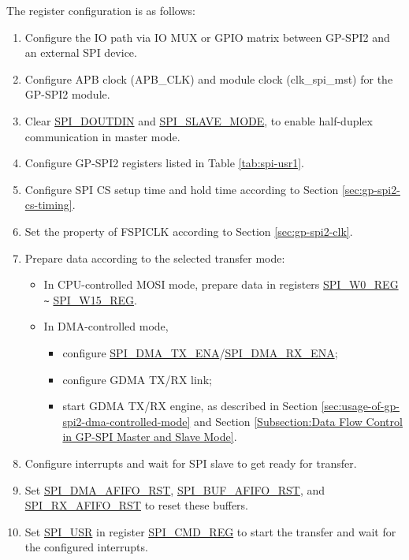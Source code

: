 \documentclass[main\_\_EN.tex]{subfiles}
\begin{document}
The register configuration is as follows:
\begin{enumerate}
    \item Configure the IO path via IO MUX or GPIO matrix between GP-SPI2 and an external SPI device.
    \item Configure APB clock (APB\_CLK) and module clock (clk\_spi\_mst) for the GP-SPI2 module.

    \item Clear \hyperref[fielddesc:SPIDOUTDIN]{SPI\_DOUTDIN} and \hyperref[fielddesc:SPISLAVEMODE]{SPI\_SLAVE\_MODE}, to enable half-duplex communication in master mode.

    \item Configure GP-SPI2 registers listed in Table \ref{tab:spi-usr1}.

    \item Configure SPI CS setup time and hold time according to Section \ref{sec:gp-spi2-cs-timing}.

    \item Set the property of FSPICLK according to Section \ref{sec:gp-spi2-clk}.

    \item Prepare data according to the selected transfer mode:
    \begin{itemize}
        \item In CPU-controlled MOSI mode, prepare data in registers \hyperref[regdesc:SPIW0REG]{SPI\_W0\_REG} \verb+~+ \hyperref[regdesc:SPIW15REG]{SPI\_W15\_REG}.

        \item In DMA-controlled mode,
        \begin{itemize}
            \item configure \hyperref[fielddesc:SPIDMATXENA]{SPI\_DMA\_TX\_ENA}/\hyperref[fielddesc:SPIDMARXENA]{SPI\_DMA\_RX\_ENA};
            \item configure GDMA TX/RX link;
            \item start GDMA TX/RX engine, as described in Section \ref{sec:usage-of-gp-spi2-dma-controlled-mode} and Section \ref{Subsection:Data Flow Control in GP-SPI Master and Slave Mode}.
        \end{itemize}
    \end{itemize}

    \item Configure interrupts and wait for SPI slave to get ready for transfer.

    \item Set \hyperref[fielddesc:SPIDMAAFIFORST]{SPI\_DMA\_AFIFO\_RST}, \hyperref[fielddesc:SPIBUFAFIFORST]{SPI\_BUF\_AFIFO\_RST}, and \hyperref[fielddesc:SPIRXAFIFORST]{SPI\_RX\_AFIFO\_RST} to reset these buffers.

    \item Set \hyperref[fielddesc:SPIUSR]{SPI\_USR} in register \hyperref[regdesc:SPICMDREG]{SPI\_CMD\_REG} to start the transfer and wait for the configured interrupts.
\end{enumerate}
\end{document}
